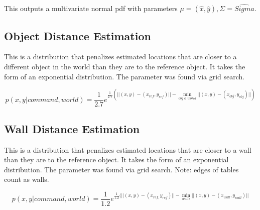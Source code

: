 \documentclass[12pt,letterpaper]{article}
\begin{document}
This outputs a multivariate normal pdf with parameters $\mu = (\hat{x}, \hat{y}), \Sigma = \hat{Sigma}$.

\subsection{Object Distance Estimation}
This is a distribution that penalizes estimated locations that are closer to a different object in the world than they are to the reference object. It takes the form of an exponential distribution. The parameter was found via grid search.

\[
p(x, y | command, world) = \frac{1}{2.7}e^{\frac{1}{2.7}(||(x, y) - (x_{ref}, y_{ref})|| - \min_{obj \in world} ||(x, y) - (x_{obj}, y_{obj})||)}
\]
\newpage
\subsection{Wall Distance Estimation}
This is a distribution that penalizes estimated locations that are closer to a wall than they are to the reference object. It takes the form of an exponential distribution. The parameter was found via grid search. Note: edges of tables count as walls.

\[
p(x, y | command, world) = \frac{1}{1.2}e^{\frac{1}{1.2}(||(x, y) - (x_{ref,} y_{ref})|| - \min_{walls} ||(x, y) - (x_{wall}, y_{wall})||}
\]
\end{document}
